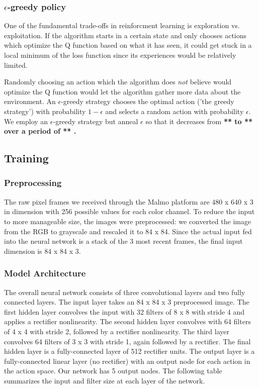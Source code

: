 \documentclass{article}
\begin{document}
\begin{multicols}{2}
\subsubsection{$\epsilon$-greedy policy}

One of the fundamental trade-offs in reinforcment learning is exploration vs. exploitation. If the algorithm starts in a certain state and only chooses actions which optimize the Q function based on what it has seen, it could get stuck in a local minimum of the loss function since its experiences would be relatively limited.

Randomly choosing an action which the algorithm does \emph{not} believe would optimize the Q function would let the algorithm gather more data about the environment. An $\epsilon$-greedy strategy chooses the optimal action ('the greedy strategy') with probability $1-\epsilon$ and selects a random action with probability $\epsilon$.
We employ an $\epsilon$-greedy strategy but anneal $\epsilon$ so that it decreases from \bf *** \rm to \bf *** \rm over a period of \bf *** \rm.


\subsection{Training}

\subsubsection{Preprocessing}

The raw pixel frames we received through the Malmo platform are 480 x 640 x 3 in dimension with 256 possible values for each color channel. To reduce the input to more manageable size, the images were preprocessed: we converted the image from the RGB to grayscale and rescaled it to 84 x 84. Since the actual input fed into the neural network is a stack of the 3 most recent frames, the final input dimension is 84 x 84 x 3.

\subsubsection{Model Architecture}

The overall neural network consists of three convolutional layers and two fully connected layers. The input layer takes an 84 x 84 x 3 preprocessed image. The first hidden layer convolves the input with 32 filters of 8 x 8 with stride 4 and applies a rectifier nonlinearity. The second hidden layer convolves with 64 filters of 4 x 4 with stride 2, followed by a rectifier nonlinearity. The third layer convolves 64 filters of 3 x 3 with stride 1, again followed by a rectifier. The final hidden layer is a fully-connected layer of 512 rectifier units. The output layer is a fully-connected linear layer (no rectifier) with an output node for each action in the action space. Our network has 5 output nodes. The following table summarizes the input and filter size at each layer of the network.
\newline


\end{multicols}
\end{document}
